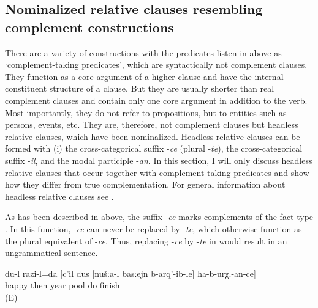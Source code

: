 \subsection{Nominalized relative clauses resembling complement constructions}
\label{ssec:Nominalized relative clauses resembling complement constructions}
There are a variety of constructions with the predicates listen in  above as `complement-taking predicates', which are syntactically not complement clauses. They function as a core argument of a higher clause and have the internal constituent structure of a clause. But they are usually shorter than real complement clauses and contain only one core argument in addition to the verb. Most importantly, they do not refer to propositions, but to entities such as persons, events, etc. They are, therefore, not complement clauses but headless relative clauses, which have been nominalized. Headless relative clauses can be formed with (i) the cross-categorical suffix -\textit{ce} (plural -\textit{te}), the cross-categorical suffix -\textit{il}, and the modal participle -\textit{an}. In this section, I will only discuss headless relative clauses that occur together with complement-taking predicates and show how they differ from true complementation. For general information about headless relative clauses see .

As has been described in  above, the suffix -\textit{ce} marks complements of the fact-type . In this function, -\textit{ce} can never be replaced by  -\textit{te}, which otherwise function as the plural equivalent of -\textit{ce}. Thus, replacing -\textit{ce} by -\textit{te} in  would result in an ungrammatical sentence.

\begin{exe}
		\ex	\label{‎‎‎I am happy that during the next year we will finish}
	\gll	du-l		razi-l=da		[c'il	dus	[nušːa-l	basːejn	b-arq'-ib-le]		ha-b-urχː-an-ce]\\
			happy	then	year		pool	do	finish \\
	\glt	{} (E)
\end{exe}
	
